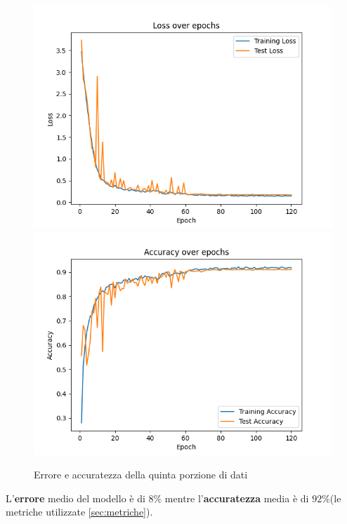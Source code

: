 \begin{figure}[!ht]
	\begin{adjustbox}{width=0.9\columnwidth, center}
    \includegraphics{./images/fold_4_loss.png} \includegraphics{./images/fold_4_accuracy.png}
  \end{adjustbox}
  \caption{Errore e accuratezza della quinta porzione di dati}
  \label{fig:loss e accuratezza della quinta porzione di dati}
\end{figure}

L'\textbf{errore} medio del modello \`e di \textbf{$8\%$} mentre l'\textbf{accuratezza} media \`e di \textbf{$92\%$}(le metriche utilizzate \autoref{sec:metriche}).



